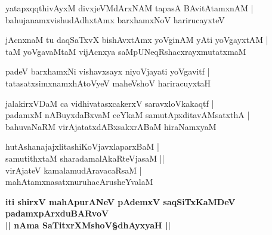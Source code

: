 \begin{shloka}
yatapxqqthivAyxM divxjeVMdArxNAM tapasA BAvitAtamxnAM |\\
bahujanamxvishudAdhxtAmx barxhamxNoV harirucayxteV 
\end{shloka}

\begin{shloka}
jAcnxnaM tu daqSaTxvX bishAvxtAmx yoVginAM yAti yoVgayxtAM |\\
taM yoVgavaMtaM vijAcnxya saMpUNeqRshacxrayxmutatxmaM
\end{shloka}

\begin{shloka}
padeV barxhamxNi vishavxsayx niyoVjayati yoVgavitf |\\
tatasatxsimxnamxhAtoVyeV maheVshoV hariracuyxtaH 
\end{shloka}

\begin{shloka}
jalakirxVDaM ca vidhivatasxcakerxV saravxloVkakaqtf |\\
padamxM nABuyxdaBxvaM ceYkaM samutApxditavAMsatxthA |\\
bahuvaNaRM virAjatatxdABxsakxrABaM hiraNamxyaM 
\end{shloka}

\begin{shloka}
hutAshanajajxlitashiKoVjavxlaparxBaM |\\
samutithxtaM sharadamalAkaRteVjasaM ||\\
virAjateV kamalamudAravacaRsaM |\\
mahAtamxnasatxnuruhacArusheYvalaM 
\end{shloka}

\begin{center}
\textbf{iti shirxV mahApurANeV pAdemxV saqSiTxKaMDeV padamxpArxduBARvoV}\\
\textbf{|| nAma SaTitxrXMshoV\S dhAyxyaH ||}
\end{center}
